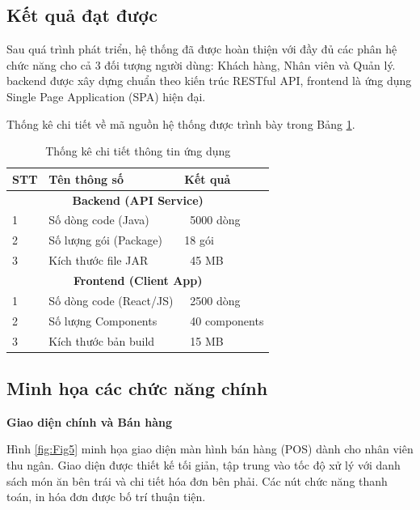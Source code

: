 \subsection{Kết quả đạt được}
Sau quá trình phát triển, hệ thống đã được hoàn thiện với đầy đủ các phân hệ chức năng cho cả 3 đối tượng người dùng: Khách hàng, Nhân viên và Quản lý. backend được xây dựng chuẩn theo kiến trúc RESTful API, frontend là ứng dụng Single Page Application (SPA) hiện đại.

Thống kê chi tiết về mã nguồn hệ thống được trình bày trong Bảng \ref{tab:code_stats}.

\begin{table}[H]
    \centering
    \caption{Thống kê chi tiết thông tin ứng dụng}
    \label{tab:code_stats}
    \begin{tabular}{|p{1cm}|p{5cm}|p{4cm}|}
        \hline
        \textbf{STT} & \textbf{Tên thông số} & \textbf{Kết quả} \\
        \hline
        \multicolumn{3}{|c|}{\textbf{Backend (API Service)}} \\
        \hline
        1 & Số dòng code (Java) & ~5000 dòng \\
        \hline
        2 & Số lượng gói (Package) & 18 gói \\
        \hline
        3 & Kích thước file JAR & ~45 MB \\
        \hline
        \multicolumn{3}{|c|}{\textbf{Frontend (Client App)}} \\
        \hline
        1 & Số dòng code (React/JS) & ~2500 dòng \\
        \hline
        2 & Số lượng Components & ~40 components \\
        \hline
        3 & Kích thước bản build & ~15 MB \\
        \hline
    \end{tabular}
\end{table}

\subsection{Minh họa các chức năng chính}

\textbf{Giao diện chính và Bán hàng}

Hình \ref{fig:Fig5} minh họa giao diện màn hình bán hàng (POS) dành cho nhân viên thu ngân. Giao diện được thiết kế tối giản, tập trung vào tốc độ xử lý với danh sách món ăn bên trái và chi tiết hóa đơn bên phải. Các nút chức năng thanh toán, in hóa đơn được bố trí thuận tiện.

